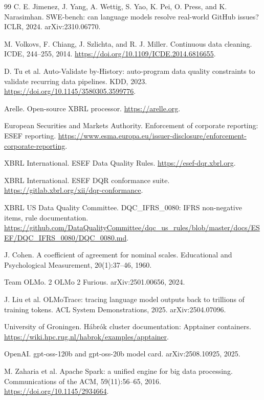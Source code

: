 \documentclass[11pt,a4paper]{article}
\begin{document}
\begin{thebibliography}{99}
 C. E. Jimenez, J. Yang, A. Wettig, S. Yao, K. Pei, O. Press, and K. Narasimhan. SWE-bench: can language models resolve real-world GitHub issues? ICLR, 2024. arXiv:2310.06770.

 M. Volkovs, F. Chiang, J. Szlichta, and R. J. Miller. Continuous data cleaning. ICDE, 244--255, 2014. \url{https://doi.org/10.1109/ICDE.2014.6816655}.

 D. Tu et al. Auto-Validate by-History: auto-program data quality constraints to validate recurring data pipelines. KDD, 2023. \url{https://doi.org/10.1145/3580305.3599776}.

 Arelle. Open-source XBRL processor. \url{https://arelle.org}.

 European Securities and Markets Authority. Enforcement of corporate reporting: ESEF reporting. \url{https://www.esma.europa.eu/issuer-disclosure/enforcement-corporate-reporting}.

 XBRL International. ESEF Data Quality Rules. \url{https://esef-dqr.xbrl.org}.

 XBRL International. ESEF DQR conformance suite. \url{https://gitlab.xbrl.org/xii/dqr-conformance}.

 XBRL US Data Quality Committee. DQC\_IFRS\_0080: IFRS non-negative items, rule documentation. \url{https://github.com/DataQualityCommittee/dqc_us_rules/blob/master/docs/ESEF/DQC_IFRS_0080/DQC_0080.md}.

 J. Cohen. A coefficient of agreement for nominal scales. Educational and Psychological Measurement, 20(1):37--46, 1960.

 Team OLMo. 2 OLMo 2 Furious. arXiv:2501.00656, 2024.

 J. Liu et al. OLMoTrace: tracing language model outputs back to trillions of training tokens. ACL System Demonstrations, 2025. arXiv:2504.07096.

 University of Groningen. H\'abr\'ok cluster documentation: Apptainer containers. \url{https://wiki.hpc.rug.nl/habrok/examples/apptainer}.

 OpenAI. gpt-oss-120b and gpt-oss-20b model card. arXiv:2508.10925, 2025.

 M. Zaharia et al. Apache Spark: a unified engine for big data processing. Communications of the ACM, 59(11):56--65, 2016. \url{https://doi.org/10.1145/2934664}.

\end{thebibliography}
\end{document}
